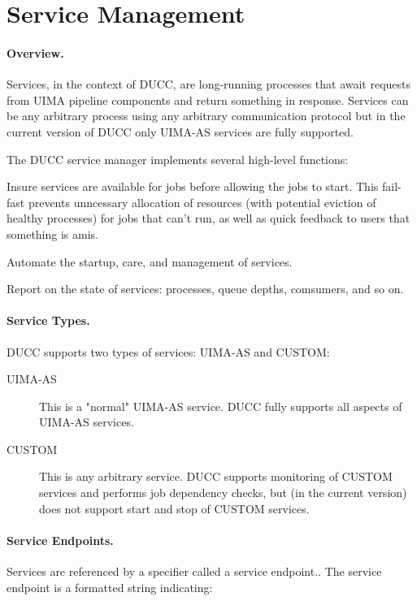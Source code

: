      \section{Service Management}
      \paragraph{Overview.} 
      Services, in the context of DUCC, are long-running processes that await requests from
      UIMA pipeline components and return something in response. Services can be any arbitrary process
      using any arbitrary communication protocol but in the current version of DUCC only UIMA-AS
      services are fully supported.

      The DUCC service manager implements several high-level functions:
      
      Insure services are available for jobs before allowing the jobs to start. This fail-fast
      prevents unncessary allocation of resources (with potential eviction of healthy processes) for
      jobs that can't run, as well as quick feedback to users that something is amis.
      
      Automate the startup, care, and management of services.
      
      Report on the state of services: processes, queue depths, comsumers, and so on.  

      \paragraph{Service Types.}
      DUCC supports two types of services: UIMA-AS and CUSTOM:
      
      \begin{description}
          \item[UIMA-AS] This is a "normal" UIMA-AS service. DUCC fully supports all aspects of UIMA-AS
            services.
            
          \item[CUSTOM] This is any arbitrary service. DUCC supports monitoring of CUSTOM services
            and performs job dependency checks, but (in the current version) does not support start
            and stop of CUSTOM services.
      \end{description}

      \paragraph{Service Endpoints.} Services are referenced by a specifier called a service
      endpoint.. The service endpoint is a formatted string indicating:

